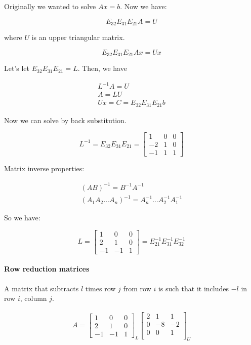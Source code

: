 Originally we wanted to solve $Ax=b$. Now we have:

\[
	E_{32}E_{31}E_{21}A = U
\]

where $U$ is an upper triangular matrix.

\[
	E_{32}E_{31}E_{21}Ax = Ux
\]

Let's let $E_{32}E_{31}E_{21} = L$. Then, we have

\[
	\begin{matrix}
		L^{-1}A=U \\
		A = LU \\
		Ux = C = E_{32}E_{31}E_{21}b
	\end{matrix}
\]

Now we can solve by back substitution.

\[
	L^{-1}=E_{32}E_{31}E_{21} = \begin{bmatrix}
		1 & 0 & 0 \\
		-2 & 1 & 0 \\
		-1 & 1 & 1 
	\end{bmatrix}
\]


Matrix inverse properties:

\[
	\begin{matrix}
		(AB)^{-1} = B^{-1}A^{-1} \\
		(A_1A_2 \dots A_n)^{-1} = A_n^{-1} \dots A_2^{-1}A_1^{-1}
	\end{matrix}
\]

So we have:

\[
	L = \begin{bmatrix}
		1 & 0 & 0 \\
		2 & 1 & 0 \\
		-1 & -1 & 1
	\end{bmatrix} = E_{21}^{-1}E_{31}^{-1}E_{32}^{-1}
\]

\paragraph{Row reduction matrices} A matrix that subtracts $l$ times row $j$ from row $i$ is such that it includes $-l$ in row $i$, column $j$.

\[
	\begin{matrix}
			A = \begin{bmatrix}
		1 & 0 & 0 \\
		2 & 1 & 0 \\
		-1 & -1 & 1
	\end{bmatrix}_L
	\begin{bmatrix}
		2 & 1 & 1 \\
		0 & -8 & -2 \\
		0 & 0 & 1 \\
	\end{bmatrix}_U
	\end{matrix}
\]

